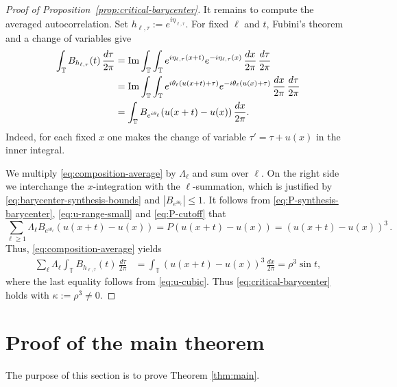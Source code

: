 \documentclass[11pt]{amsart}
\theoremstyle{definition}
\theoremstyle{remark}
\newcommand{\T}{\mathbb T}
\begin{document}
\begin{proof}[Proof of Proposition~\ref{prop:critical-barycenter}]
It remains to compute the averaged autocorrelation. Set $h_{\ell,\tau}:=e^{i\eta_{\ell,\tau}}$. For fixed $\ell$ and $t$, Fubini's theorem and a change of variables give
\begin{align}
 \int_\T B_{h_{\ell,\tau}}(t)\,\frac{d\tau}{2\pi}
 &=\operatorname{Im}\int_\T\int_\T
 e^{i\eta_{\ell,\tau}(x+t)} e^{-i\eta_{\ell,\tau}(x)}
 \,\frac{dx}{2\pi}\,\frac{d\tau}{2\pi}\notag\\
 &=\operatorname{Im}\int_\T\int_\T
 e^{i\theta_\ell(u(x+t)+\tau)}
 e^{-i\theta_\ell(u(x)+\tau)}
 \,\frac{dx}{2\pi}\,\frac{d\tau}{2\pi}\notag\\
 &=\int_\T B_{e^{i\theta_\ell}}(u(x+t)-u(x))\,\frac{dx}{2\pi}.
 \label{eq:composition-average}
\end{align}
Indeed, for each fixed $x$ one makes the change of variable $\tau'=\tau+u(x)$ in the inner integral.

We multiply \eqref{eq:composition-average} by $\Lambda_\ell$ and sum over $\ell$. On the right side we interchange the $x$-integration with the $\ell$-summation, which is justified by \eqref{eq:barycenter-synthesis-bounds} and $|B_{e^{i\theta_\ell}}|\leq1$. It follows from \eqref{eq:P-synthesis-barycenter}, \eqref{eq:u-range-small} and \eqref{eq:P-cutoff} that
$$
\sum_{\ell\geq 1} \Lambda_\ell B_{e^{i\theta_\ell}}(u(x+t)-u(x)) = P(u(x+t)-u(x)) = (u(x+t)-u(x))^3 \,.
$$
Thus, \eqref{eq:composition-average} yields
\begin{align*}
 \sum_\ell\Lambda_\ell
 \int_\T B_{h_{\ell,\tau}}(t)\,\frac{d\tau}{2\pi}
 &=\int_\T(u(x+t)-u(x))^3\,\frac{dx}{2\pi}
 =\rho^3\sin t,
\end{align*}
where the last equality follows from \eqref{eq:u-cubic}. Thus \eqref{eq:critical-barycenter} holds with $\kappa :=\rho^3\ne0$.
\end{proof}






\section{Proof of the main theorem}\label{sec:main-proof}

The purpose of this section is to prove Theorem \ref{thm:main}.
\end{document}
